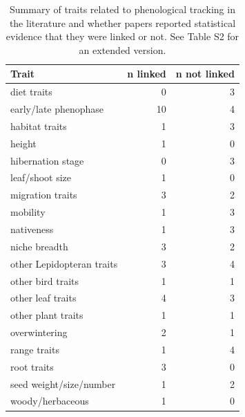 \documentclass[11pt,letter]{article}
\begin{document}
 \newpage
\begin{table}[ht]
\centering
\caption{Summary of traits related to phenological tracking in the literature and whether papers reported statistical evidence that they were linked or not. See Table S2 for an extended version.} 
\label{tab:meta1}
\begingroup\footnotesize
\begin{tabular}{lrr}
  \hline
Trait & n linked & n not linked \\ 
  \hline
diet traits &   0 &   3 \\ 
  early/late phenophase &  10 &   4 \\ 
  habitat traits &   1 &   3 \\ 
  height &   1 &   0 \\ 
  hibernation stage &   0 &   3 \\ 
  leaf/shoot size &   1 &   0 \\ 
  migration traits &   3 &   2 \\ 
  mobility &   1 &   3 \\ 
  nativeness &   1 &   3 \\ 
  niche breadth &   3 &   2 \\ 
  other Lepidopteran traits &   3 &   4 \\ 
  other bird traits &   1 &   1 \\ 
  other leaf traits &   4 &   3 \\ 
  other plant traits &   1 &   1 \\ 
  overwintering &   2 &   1 \\ 
  range traits &   1 &   4 \\ 
  root traits &   3 &   0 \\ 
  seed weight/size/number &   1 &   2 \\ 
  woody/herbaceous &   1 &   0 \\ 
   \hline
\end{tabular}
\endgroup
\end{table}%
\end{document}
